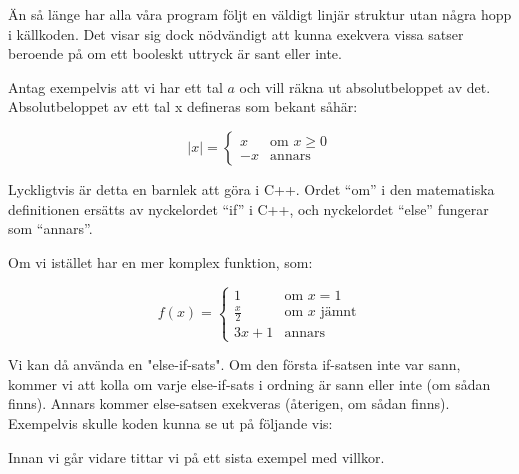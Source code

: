 Än så länge har alla våra program följt en väldigt linjär struktur utan några hopp i källkoden. Det visar sig dock nödvändigt att kunna exekvera vissa satser beroende på om ett booleskt uttryck är sant eller inte.

Antag exempelvis att vi har ett tal $a$ och vill räkna ut absolutbeloppet av det. Absolutbeloppet av ett tal x defineras som bekant såhär:

$$
|x| = 
\left\{
    \begin{array}{ll}
        x & \mbox{om } x \geq 0 \\
        -x & \mbox{annars}
    \end{array}
\right.
$$

Lyckligtvis är detta en barnlek att göra i C++. Ordet ``om'' i den matematiska definitionen ersätts av nyckelordet ``if'' i C++, och nyckelordet ``else'' fungerar som ``annars''.



Om vi istället har en mer komplex funktion, som:

$$
f(x) = 
\left\{
    \begin{array}{lll}
        1 & \mbox{om } x = 1\\
        \frac{x}{2} & \mbox{om } x \mbox{ jämnt}\\
        3x+1 & \mbox{annars}
    \end{array}
\right.
$$

Vi kan då använda en "else-if-sats". Om den första if-satsen inte var sann, kommer vi att kolla om varje else-if-sats i ordning är sann eller inte (om sådan finns). Annars kommer else-satsen exekveras (återigen, om sådan finns). Exempelvis skulle koden kunna se ut på följande vis:




Innan vi går vidare tittar vi på ett sista exempel med villkor.



